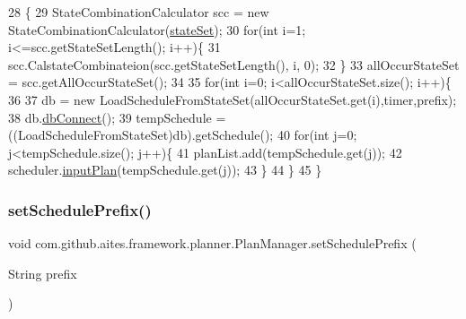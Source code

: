 \begin{DoxyCode}
28                          \{
29         StateCombinationCalculator scc = \textcolor{keyword}{new} StateCombinationCalculator(\mbox{\hyperlink{classcom_1_1github_1_1aites_1_1framework_1_1planner_1_1_plan_manager_a589a85c4c5b93ce2319ab116a4cca752}{stateSet}});
30         \textcolor{keywordflow}{for}(\textcolor{keywordtype}{int} i=1; i<=scc.getStateSetLength(); i++)\{
31             scc.CalstateCombinateion(scc.getStateSetLength(), i, 0);
32         \}
33         allOccurStateSet = scc.getAllOccurStateSet();
34         
35         \textcolor{keywordflow}{for}(\textcolor{keywordtype}{int} i=0; i<allOccurStateSet.size(); i++)\{
36             
37             db = \textcolor{keyword}{new} LoadScheduleFromStateSet(allOccurStateSet.get(i),timer,prefix);
38             db.\mbox{\hyperlink{classcom_1_1github_1_1aites_1_1framework_1_1globalknowledge_1_1_d_b_connector_a108808207e33b613b470855bb2be9223}{dbConnect}}();
39             tempSchedule = ((LoadScheduleFromStateSet)db).getSchedule();
40             \textcolor{keywordflow}{for}(\textcolor{keywordtype}{int} j=0; j<tempSchedule.size(); j++)\{
41                 planList.add(tempSchedule.get(j));
42                 scheduler.\mbox{\hyperlink{classcom_1_1github_1_1aites_1_1framework_1_1executor_1_1_scheduler_a332ea628bce7c64317ed4a4f86583c24}{inputPlan}}(tempSchedule.get(j));
43             \}
44         \}
45     \}
\end{DoxyCode}
\mbox{\label{classcom_1_1github_1_1aites_1_1framework_1_1planner_1_1_plan_manager_a675d5c33e24e10824f98ea062791a051}} 
\subsubsection{\texorpdfstring{set\+Schedule\+Prefix()}{setSchedulePrefix()}}
{\footnotesize\ttfamily void com.\+github.\+aites.\+framework.\+planner.\+Plan\+Manager.\+set\+Schedule\+Prefix (\begin{DoxyParamCaption}\item[{String}]{prefix }\end{DoxyParamCaption})}



